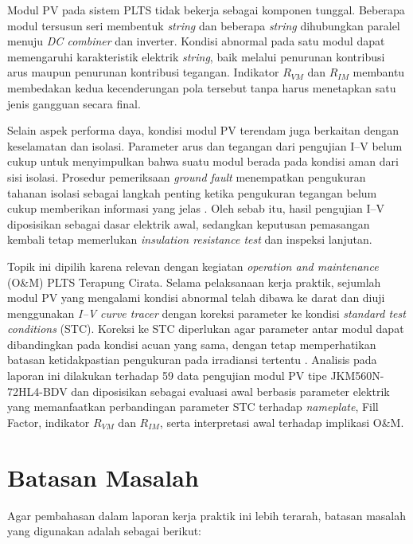 Modul PV pada sistem PLTS tidak bekerja sebagai komponen tunggal. Beberapa
modul tersusun seri membentuk \textit{string} dan beberapa \textit{string}
dihubungkan paralel menuju \textit{DC combiner} dan inverter. Kondisi abnormal
pada satu modul dapat memengaruhi karakteristik elektrik \textit{string},
baik melalui penurunan kontribusi arus maupun penurunan kontribusi tegangan.
Indikator $R_{VM}$ dan $R_{IM}$ membantu membedakan kedua kecenderungan pola
tersebut tanpa harus menetapkan satu jenis gangguan secara final.

Selain aspek performa daya, kondisi modul PV terendam juga berkaitan dengan
keselamatan dan isolasi. Parameter arus dan tegangan dari pengujian I--V belum
cukup untuk menyimpulkan bahwa suatu modul berada pada kondisi aman dari sisi
isolasi. Prosedur pemeriksaan \textit{ground fault} menempatkan pengukuran
tahanan isolasi sebagai langkah penting ketika pengukuran tegangan belum cukup
memberikan informasi yang jelas \cite{smaGroundFault}. Oleh sebab itu, hasil
pengujian I--V diposisikan sebagai dasar elektrik awal, sedangkan keputusan
pemasangan kembali tetap memerlukan \textit{insulation resistance test} dan
inspeksi lanjutan.

Topik ini dipilih karena relevan dengan kegiatan \textit{operation and
maintenance} (O\&M) PLTS Terapung Cirata. Selama pelaksanaan kerja praktik,
sejumlah modul PV yang mengalami kondisi abnormal telah dibawa ke darat dan
diuji menggunakan \textit{I--V curve tracer} dengan koreksi parameter ke
kondisi \textit{standard test conditions} (STC). Koreksi ke STC diperlukan
agar parameter antar modul dapat dibandingkan pada kondisi acuan yang sama,
dengan tetap memperhatikan batasan ketidakpastian pengukuran pada irradiansi
tertentu \cite{iec60891,iec61829}. Analisis pada laporan ini dilakukan terhadap
59 data pengujian modul PV tipe JKM560N-72HL4-BDV dan diposisikan sebagai
evaluasi awal berbasis parameter elektrik yang memanfaatkan perbandingan
parameter STC terhadap \textit{nameplate}, Fill Factor, indikator $R_{VM}$ dan
$R_{IM}$, serta interpretasi awal terhadap implikasi O\&M.

\section{Batasan Masalah}

Agar pembahasan dalam laporan kerja praktik ini lebih terarah, batasan masalah
yang digunakan adalah sebagai berikut:

